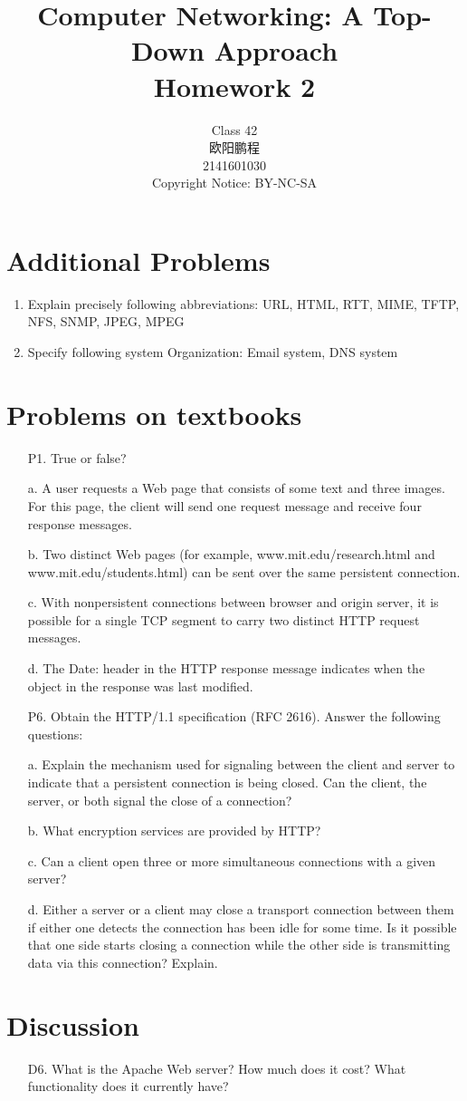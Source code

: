 \documentclass[]{article}
\title{Computer Networking: A Top-Down Approach \\ Homework 2}
\author{Class 42 \\ 欧阳鹏程 \\ 2141601030 \\ Copyright Notice: BY-NC-SA}
\begin{document}
\maketitle

\section{Additional Problems}
\begin{enumerate}
	\item Explain precisely following abbreviations:
	\subitem URL, HTML, RTT, MIME, TFTP, NFS, SNMP, JPEG, MPEG
	
	
	\item Specify following system Organization:
	\subitem Email system, DNS system
	
\end{enumerate}

\section{Problems on textbooks}
\begin{enumerate}
	\item[P1.] True or false?
	
	a. A user requests a Web page that consists of some text and three images.
	For this page, the client will send one request message and receive four
	response messages.
	
	b. Two distinct Web pages (for example, www.mit.edu/research.html
	and www.mit.edu/students.html) can be sent over the same persistent connection.
	
	c. With nonpersistent connections between browser and origin server, it is possible for a single TCP segment to carry two distinct HTTP request messages.
	
	d. The Date: header in the HTTP response message indicates when the	object in the response was last modified.
	
	
	\item[P6.] Obtain the HTTP/1.1 specification (RFC 2616). Answer the following questions:
	
	a. Explain the mechanism used for signaling between the client and server to indicate that a persistent connection is being closed. Can the client, the	server, or both signal the close of a connection?
	
	b. What encryption services are provided by HTTP?
	
	c. Can a client open three or more simultaneous connections with a given	server?
	
	d. Either a server or a client may close a transport connection between them if either one detects the connection has been idle for some time. Is it possible that one side starts closing a connection while the other side is transmitting data via this connection? Explain.
	
\end{enumerate}

\section{Discussion}
\begin{enumerate}
	\item[D6.] What is the Apache Web server? How much does it cost? What functionality does it currently have?
	
\end{enumerate}
\end{document}
